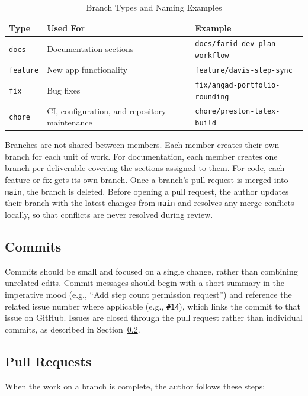 \documentclass{article}
\begin{document}
\begin{table}[H]
\caption{Branch Types and Naming Examples} \label{TblBranchTypes}
\begin{tabularx}{\textwidth}{lXl}
\toprule
\textbf{Type} & \textbf{Used For} & \textbf{Example}\\
\midrule
\texttt{docs} & Documentation sections & \texttt{docs/farid-dev-plan-workflow}\\
\texttt{feature} & New app functionality & \texttt{feature/davis-step-sync}\\
\texttt{fix} & Bug fixes & \texttt{fix/angad-portfolio-rounding}\\
\texttt{chore} & CI, configuration, and repository maintenance & \texttt{chore/preston-latex-build}\\
\bottomrule
\end{tabularx}
\end{table} 

Branches are not shared between members. Each member creates their own branch for each unit of work.
For documentation, each member creates one branch per deliverable covering the sections assigned to them. For code, each feature or fix gets its own branch. Once a branch's pull request is merged into \texttt{main}, the branch is deleted. Before opening a pull request, the author updates their branch with the latest changes from \texttt{main} and resolves any merge conflicts locally, so that conflicts are never resolved during review.

\subsection{Commits}

Commits should be small and focused on a single change, rather than combining unrelated edits. 
Commit messages should begin with a short summary in the imperative mood (e.g., ``Add step count permission request'') and reference the related issue number where applicable (e.g., \texttt{\#14}), which links the commit to that issue on GitHub. 
Issues are closed through the pull request rather than individual commits, as described in Section~\ref{SecPullRequests}.

\subsection{Pull Requests} \label{SecPullRequests}

When the work on a branch is complete, the author follows these steps:
\end{document}
